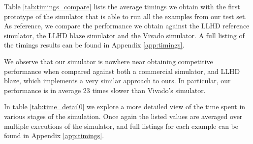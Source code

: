 Table \ref{tab:timings_compare} lists the average timings we obtain with the first prototype of the simulator that is able to run all the examples from our test set. As reference, we compare the performance we obtain against the LLHD reference simulator, the LLHD blaze simulator and the Vivado simulator. A full listing of the timings results can be found in Appendix \ref{app:timings}.


We observe that our simulator is nowhere near obtaining competitive performance when compared against both a commercial simulator, and LLHD blaze, which implements a very similar approach to ours. In particular, our performance is in average $23$ times slower than Vivado's simulator.

In table \ref{tab:time_detail0} we explore a more detailed view of the time spent in various stages of the simulation. Once again the listed values are averaged over multiple executions of the simulator, and full listings for each example can be found in Appendix \ref{app:timings}.

